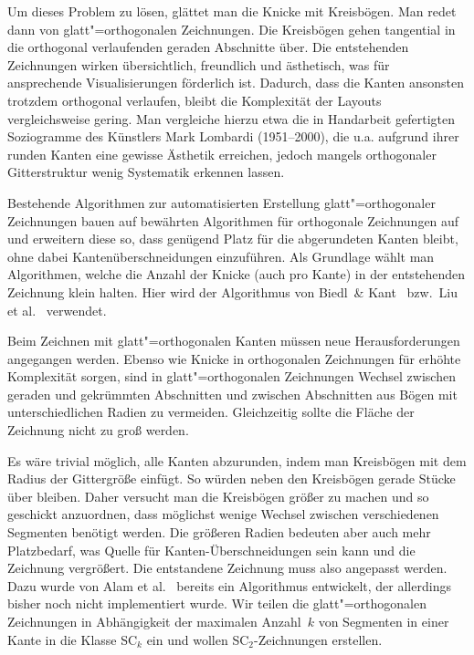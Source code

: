 \documentclass[a4paper]{scrreprt}
\theoremstyle{definition}
\begin{document}
Um dieses Problem zu lösen, glättet man die Knicke mit Kreisbögen. Man redet dann von glatt"=orthogonalen Zeichnungen. Die Kreisbögen gehen tangential in die orthogonal verlaufenden geraden Abschnitte über. Die entstehenden Zeichnungen wirken übersichtlich, freundlich und ästhetisch, was für ansprechende Visualisierungen förderlich ist. Dadurch, dass die Kanten ansonsten trotzdem orthogonal verlaufen, bleibt die Komplexität der Layouts vergleichsweise gering. Man vergleiche hierzu etwa die in Handarbeit gefertigten Soziogramme des Künstlers Mark Lombardi (1951--2000), die u.a. aufgrund ihrer runden Kanten eine gewisse Ästhetik erreichen, jedoch mangels orthogonaler Gitterstruktur wenig Systematik erkennen lassen. 

Bestehende Algorithmen zur automatisierten Erstellung glatt"=orthogonaler Zeichnungen bauen auf bewährten Algorithmen für orthogonale Zeichnungen auf und erweitern diese so, dass genügend Platz für die abgerundeten Kanten bleibt, ohne dabei Kantenüberschneidungen einzuführen. Als Grundlage wählt man Algorithmen, welche die Anzahl der Knicke (auch pro Kante) in der entstehenden Zeichnung klein halten. Hier wird der Algorithmus von Biedl~\& Kant~\cite{biedl+kant-98} bzw.\ Liu et al.~\cite{liu+etal-98} verwendet.

Beim Zeichnen mit glatt"=orthogonalen Kanten müssen neue Herausforderungen angegangen werden. Ebenso wie Knicke in orthogonalen Zeichnungen für erhöhte Komplexität sorgen, sind in glatt"=orthogonalen Zeichnungen Wechsel zwischen geraden und gekrümmten Abschnitten und zwischen Abschnitten aus Bögen mit unterschiedlichen Radien zu vermeiden. Gleichzeitig sollte die Fläche der Zeichnung nicht zu groß werden.

Es wäre trivial möglich, alle Kanten abzurunden, indem man Kreisbögen mit dem Radius der Gittergröße einfügt. So würden neben den Kreisbögen gerade Stücke über bleiben. Daher versucht man die Kreisbögen größer zu machen und so geschickt anzuordnen, dass möglichst wenige Wechsel zwischen verschiedenen Segmenten benötigt werden. Die größeren Radien bedeuten aber auch mehr Platzbedarf, was Quelle für Kanten-Überschneidungen sein kann und die Zeichnung vergrößert. Die entstandene Zeichnung muss also angepasst werden. Dazu wurde von Alam et al.~\cite{smooth-13} bereits ein Algorithmus entwickelt, der allerdings bisher noch nicht implementiert wurde. Wir teilen die glatt"=orthogonalen Zeichnungen in Abhängigkeit der maximalen Anzahl~$k$ von Segmenten in einer Kante in die Klasse SC$_k$ ein und wollen SC$_2$-Zeichnungen erstellen.
\end{document}
